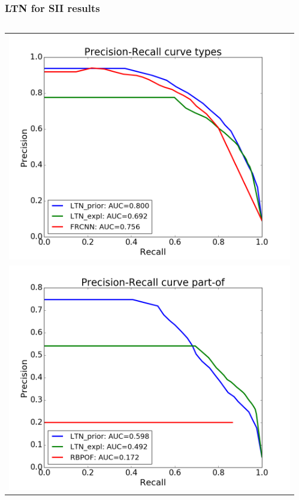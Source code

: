 \documentclass[xcolor=pdftex,dvipsnames,table]{beamer}
\begin{document}
\begin{frame}
  \frametitle{LTN for SII results}
  \begin{columns}
    \begin{column}{.4\textwidth}
    \begin{tabular}{l}
    \includegraphics[width=\textwidth]{prec_rec_curve_0_types.png} \\
    \includegraphics[width=\textwidth]{prec_rec_curve_0_part-of.png}  
    \end{tabular}
  \end{column}
  \begin{column}{.55\textwidth}

\end{column}
\end{columns}
\end{frame}
\end{document}
